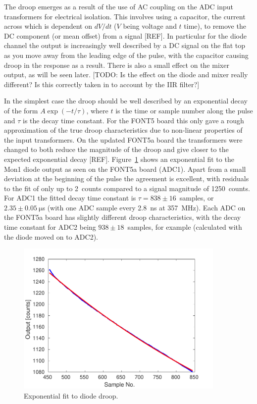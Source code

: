 The droop emerges as a result of the use of AC coupling on the ADC input transformers for electrical isolation. This involves using a capacitor, the current across which is dependent on \({dV}/{dt}\) (\(V\) being voltage and \(t\) time), to remove the DC component (or mean offset) from a signal [REF]. In particular for the diode channel the output is increasingly well described by a DC signal on the flat top as you move away from the leading edge of the pulse, with the capacitor causing droop in the response as a result. There is also a small effect on the mixer output, as will be seen later. [TODO: Is the effect on the diode and mixer really different? Is this correctly taken in to account by the IIR filter?]

In the simplest case the droop should be well described by an exponential decay of the form \(A\exp\left(-t/\tau\right)\), where \(t\) is the time or sample number along the pulse and \(\tau\) is the decay time constant. For the FONT5 board this only gave a rough approximation of the true droop characteristics due to non-linear properties of the input transformers. On the updated FONT5a board the transformers were changed to both reduce the magnitude of the droop and give closer to the expected exponential decay [REF]. Figure~\ref{f:iirDiodeFit} shows an exponential fit to the Mon1 diode output as seen on the FONT5a board (ADC1). Apart from a small deviation at the beginning of the pulse the agreement is excellent, with residuals to the fit of only up to 2~counts compared to a signal magnitude of 1250~counts. For ADC1 the fitted decay time constant is \(\tau = 838\pm16\)~samples, or \(2.35\pm0.05~\mathrm{\mu}\)s (with one ADC sample every 2.8~ns at 357~MHz). Each ADC on the FONT5a board has slightly different droop characteristics, with the decay time constant for ADC2 being \(938\pm18\)~samples, for example (calculated with the diode moved on to ADC2).

\begin{figure}
  \centering
  \includegraphics[width=0.9\textwidth]{Figures/commissioning/iirDiodeFit}
  \caption{Exponential fit to diode droop.}
  \label{f:iirDiodeFit}
\end{figure}

